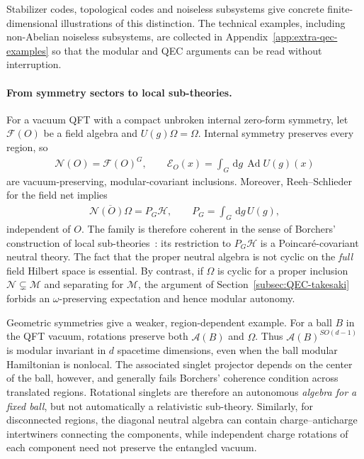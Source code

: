 \documentclass[a4paper,11pt]{article}
\theoremstyle{definition}
\newcommand{\dd}{\,\mathrm{d}}
\newcommand{\cH}{\mathcal{H}}
\newcommand{\mN}{\mathcal{N}}
\newcommand{\mM}{\mathcal{M}}
\newcommand{\mE}{\mathcal{E}}
\begin{document}
Stabilizer codes, topological codes and noiseless subsystems give concrete finite-dimensional illustrations of this distinction. The technical examples, including non-Abelian noiseless subsystems, are collected in Appendix~\ref{app:extra-qec-examples} so that the modular and QEC arguments can be read without interruption.

\paragraph{From symmetry sectors to local sub-theories.}
For a vacuum QFT with a compact unbroken internal zero-form symmetry,
let $\mathcal F(O)$ be a field algebra and $U(g)\Omega=\Omega$. Internal
symmetry preserves every region, so
\begin{align}
 \mN(O)=\mathcal F(O)^G,\qquad
 \mE_O(x)=\int_G\dd g\,\operatorname{Ad}U(g)(x)
 \label{eq:internal-neutral-net}
\end{align}
are vacuum-preserving, modular-covariant inclusions. Moreover,
Reeh--Schlieder for the field net implies
\begin{align}
 \overline{\mN(O)\Omega}=P_G\cH,
 \qquad P_G=\int_G\dd g\,U(g),
 \label{eq:internal-coherent-projection}
\end{align}
independent of $O$. The family is therefore coherent in the sense of
Borchers' construction of local sub-theories~\cite{revolutionizing}:
its restriction to $P_G\cH$ is a Poincar\'e-covariant neutral theory.
The fact that the proper neutral algebra is not cyclic on the \emph{full}
field Hilbert space is essential. By contrast, if $\Omega$ is cyclic for
a proper inclusion $\mN\subsetneq\mM$ and separating for $\mM$, the
argument of Section~\ref{subsec:QEC-takesaki} forbids an
$\omega$-preserving expectation and hence modular autonomy.

Geometric symmetries give a weaker, region-dependent example. For a
ball $B$ in the QFT vacuum, rotations preserve both $\mathcal A(B)$ and
$\Omega$. Thus $\mathcal A(B)^{SO(d-1)}$ is modular invariant in
$d$ spacetime dimensions, even when the ball modular Hamiltonian is
nonlocal. The associated singlet projector depends on the center of the
ball, however, and generally fails Borchers' coherence condition across
translated regions. Rotational singlets are therefore an autonomous
\emph{algebra for a fixed ball}, but not automatically a relativistic
sub-theory. Similarly, for disconnected regions, the diagonal neutral
algebra can contain charge--anticharge intertwiners connecting the
components, while independent charge rotations of each component need
not preserve the entangled vacuum.
\end{document}
